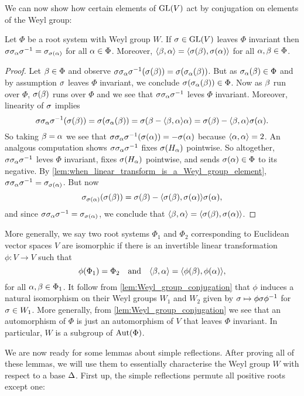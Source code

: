 \documentclass[12pt,reqno,oneside]{amsart}
\begin{document}
    We can now show how certain elements of $\mathrm{GL}(V)$ act by conjugation on elements of the Weyl group:

    \begin{lemma}\label{lem:Weyl_group_conjugation}
        Let $\Phi$ be a root system with Weyl group $W$. If $\sigma \in \mathrm{GL}(V)$ leaves $\Phi$ invariant then $\sigma\sigma_{\alpha}\sigma^{-1} = \sigma_{\sigma(\alpha)}$ for all $\alpha \in \Phi$. Moreover, $\langle\beta,\alpha\rangle = \langle\sigma(\beta),\sigma(\alpha)\rangle$ for all $\alpha,\beta \in \Phi$.
    \end{lemma}
    \begin{proof}
        Let $\beta \in \Phi$ and observe $\sigma\sigma_{\alpha}\sigma^{-1}(\sigma(\beta)) = \sigma(\sigma_{\alpha}(\beta))$. But as $\sigma_{\alpha}(\beta) \in \Phi$ and by assumption $\sigma$ leaves $\Phi$ invariant, we conclude $\sigma(\sigma_{\alpha}(\beta)) \in \Phi$. Now as $\beta$ run over $\Phi$, $\sigma(\beta)$ runs over $\Phi$ and we see that $\sigma\sigma_{\alpha}\sigma^{-1}$ leves $\Phi$ invariant. Moreover, linearity of $\sigma$ implies
        \[
            \sigma\sigma_{\alpha}\sigma^{-1}(\sigma(\beta)) = \sigma(\sigma_{\alpha}(\beta)) = \sigma(\beta-\langle\beta,\alpha\rangle\alpha) = \sigma(\beta)-\langle\beta,\alpha\rangle\sigma(\alpha).
        \]
        So taking $\beta = \alpha$ we see that $\sigma\sigma_{\alpha}\sigma^{-1}(\sigma(\alpha)) = -\sigma(\alpha)$ because $\langle\alpha,\alpha\rangle = 2$. An analgous computation shows $\sigma\sigma_{\alpha}\sigma^{-1}$ fixes $\sigma(H_{\alpha})$ pointwise. So altogether, $\sigma\sigma_{\alpha}\sigma^{-1}$ leves $\Phi$ invariant, fixes $\sigma(H_{\alpha})$ pointwise, and sends $\sigma(\alpha) \in \Phi$ to its negative. By \cref{lem:when_linear_transform_is_a_Weyl_group_element}, $\sigma\sigma_{\alpha}\sigma^{-1} = \sigma_{\sigma(\alpha)}$. But now
        \[
            \sigma_{\sigma(\alpha)}(\sigma(\beta)) = \sigma(\beta)-\langle\sigma(\beta),\sigma(\alpha)\rangle\sigma(\alpha),
        \]
        and since $\sigma\sigma_{\alpha}\sigma^{-1} = \sigma_{\sigma(\alpha)}$, we conclude that $\langle\beta,\alpha\rangle = \langle\sigma(\beta),\sigma(\alpha)\rangle$.
    \end{proof}

    More generally, we say two root systems $\Phi_{1}$ and $\Phi_{2}$ corresponding to Euclidean vector spaces $V$ are isomorphic if there is an invertible linear transformation $\phi:V \to V$ such that
    \[
        \phi(\Phi_{1}) = \Phi_{2} \quad \text{and} \quad \langle\beta,\alpha\rangle = \langle\phi(\beta),\phi(\alpha)\rangle,
    \]
    for all $\alpha,\beta \in \Phi_{1}$. It follow from \cref{lem:Weyl_group_conjugation} that $\phi$ induces a natural isomorphism on their Weyl groups $W_{1}$ and $W_{2}$ given by $\sigma \mapsto \phi\sigma\phi^{-1}$ for $\sigma \in W_{1}$. More generally, from \cref{lem:Weyl_group_conjugation} we see that an automorphism of $\Phi$ is just an automorphism of $V$ that leaves $\Phi$ invariant. In particular, $W$ is a subgroup of $\operatorname{\mathrm{Aut}}(\Phi)$.

    We are now ready for some lemmas about simple reflections. After proving all of these lemmas, we will use them to essentially characterise the Weyl group $W$ with respect to a base $\Delta$. First up, the simple reflections permute all positive roots except one:
\end{document}
